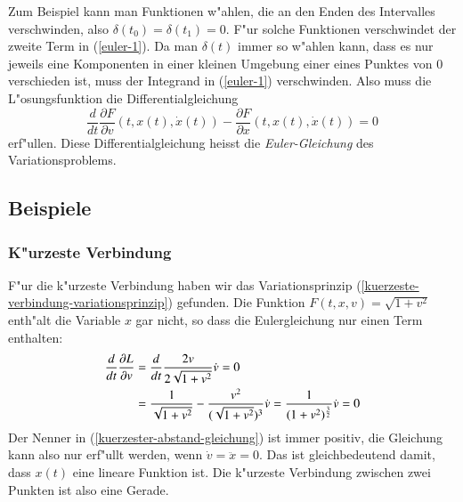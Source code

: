 Zum Beispiel kann man Funktionen w"ahlen, die an den Enden des Intervalles
verschwinden, also $\delta(t_0)=\delta(t_1)=0$.
F"ur solche Funktionen verschwindet der zweite Term in
(\ref{euler-1}). Da man $\delta(t)$ immer so w"ahlen kann, dass es
nur jeweils eine Komponenten in einer kleinen Umgebung einer eines
Punktes von $0$ verschieden ist, muss
der Integrand in (\ref{euler-1}) verschwinden.
Also muss die L"osungsfunktion die Differentialgleichung
\begin{equation}
\frac{d}{dt}\frac{\partial F}{\partial v}(t,x(t),\dot x(t))
-
\frac{\partial F}{\partial x}(t,x(t),\dot x(t))
=
0
\end{equation}
erf"ullen. Diese Differentialgleichung heisst die {\it Euler-Gleichung}
des Variationsproblems.


\subsection{Beispiele}
\subsubsection{K"urzeste Verbindung}
F"ur die k"urzeste Verbindung haben wir das Variationsprinzip
(\ref{kuerzeste-verbindung-variationsprinzip}) gefunden.
Die Funktion $F(t,x,v)=\sqrt{1+v^2}$ enth"alt die Variable
$x$ gar nicht, so dass die Eulergleichung nur einen Term
enthalten:
\begin{align}
\frac{d}{dt}\frac{\partial L}{\partial v}
&=\frac{d}{dt}\frac{2v}{2\sqrt{1+v^2}}\dot v =0
\notag
\\
&=\frac1{\sqrt{1+v^2}} - \frac{v^2}{(\sqrt{1+v^2})^3}\dot v
=\frac1{(1+v^2)^{\frac32}}\dot v=0
\label{kuerzester-abstand-gleichung}
\end{align}
Der Nenner in (\ref{kuerzester-abstand-gleichung}) ist immer
positiv, die Gleichung kann also nur erf"ullt werden, wenn
$\dot v =\ddot x=0$. Das ist gleichbedeutend damit, dass 
$x(t)$ eine lineare Funktion ist.
Die k"urzeste Verbindung zwischen zwei Punkten ist also eine
Gerade.

